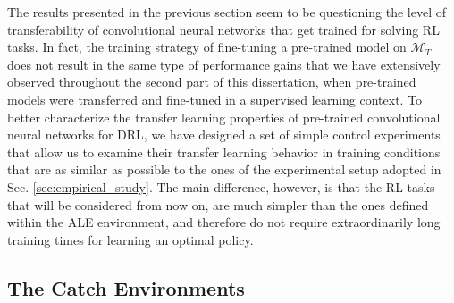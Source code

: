 The results presented in the previous section seem to be questioning the level of transferability of convolutional neural networks that get trained for solving RL tasks. In fact, the training strategy of fine-tuning a pre-trained model on $\mathcal{M}_T$ does not result in the same type of performance gains that we have extensively observed throughout the second part of this dissertation, when pre-trained models were transferred and fine-tuned in a supervised learning context. To better characterize the transfer learning properties of pre-trained convolutional neural networks for DRL, we have designed a set of simple control experiments that allow us to examine their transfer learning behavior in training conditions that are as similar as possible to the ones of the experimental setup adopted in Sec. \ref{sec:empirical_study}. The main difference, however, is that the RL tasks that will be considered from now on, are much simpler than the ones defined within the ALE environment, and therefore do not require extraordinarily long training times for learning an optimal policy.   

\subsection{The Catch Environments}
\label{sec:catch_environments}

